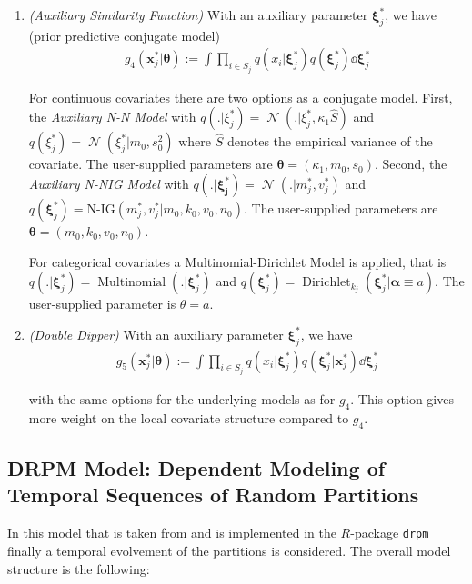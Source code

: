 \documentclass[12pt,a4paper]{article}
\newcommand{\drpm}{\texttt{drpm}}
\DeclareMathOperator{\Normal}{\mathcal{N}}
\DeclareMathOperator{\Multinomial}{\mathrm{Multinomial}}
\DeclareMathOperator{\Dir}{\mathrm{Dirichlet}}
\begin{document}
\begin{enumerate}
    \item  \textit{(Auxiliary Similarity Function)} With an auxiliary parameter
    $\pmb{\xi}_j^*$, we have (prior predictive conjugate model)
    \begin{align*}
        g_4(\pmb{x}_j^* \vert \pmb{\theta}) := \int \prod_{i \in S_j} q(x_i \vert \pmb{\xi}^*_j) q(\pmb{\xi}^*_j) \dd \pmb{\xi}^*_j
    \end{align*}
    
    For continuous covariates there are two options as a conjugate model. First, the \textit{Auxiliary N-N Model} with $q(. \vert \xi_j^*) = \Normal (. \vert \xi_j^*, \kappa_1 \hat{S})$  and $q(\xi_j^*) = \Normal (\xi_j^* \vert m_0, s_0^2)$ where $\hat{S}$ denotes the empirical variance of the covariate. The user-supplied parameters are $\pmb{\theta} = ( \kappa_1, m_0, s_0).$ Second, the \textit{Auxiliary N-NIG Model} with $q (. \vert \pmb{\xi_j^*}) = \Normal(. \vert m_j^*, v_j^*)$ and $q(\pmb{\xi}_j^*) = \text{N-IG} (m_j^*, v_j^* \vert m_0, k_0, v_0, n_0)$. The user-supplied parameters are $\pmb{\theta} = (m_0, k_0,v_0, n_0)$. \medskip
    
    For categorical covariates a Multinomial-Dirichlet Model is applied, that is \newline $q(. \vert \pmb{\xi}_j^*) = \Multinomial ( . \vert \pmb{\xi}_j^* )$ and $q( \pmb{\xi}_j^*) = \Dir_{k_j} ( \pmb{\xi}_j^* \vert \pmb{\alpha} \equiv a )$. The user-supplied parameter is $\theta = a$. \medskip

    \item \textit{(Double Dipper)} With an auxiliary parameter
    $\pmb{\xi}_j^*$, we have
    \begin{align*}
        g_5(\pmb{x}_j^* \vert \pmb{\theta}) := \int \prod_{i \in S_j} q(x_i \vert \pmb{\xi}^*_j) q(\pmb{\xi}^*_j \vert \pmb{x}_j^*) \dd \pmb{\xi}^*_j
    \end{align*}

    with the same options for the underlying models as for $g_4$. This option gives more weight on the local covariate structure compared to $g_4$. 
\end{enumerate}

\subsection{DRPM Model: Dependent Modeling of Temporal Sequences of Random Partitions}

In this model that is taken from \cite{Page2021-Temporal} and is implemented in the $R$-package \drpm{} \cite{drpm} finally a temporal evolvement of the partitions is considered. The overall model structure is the following:
\end{document}
